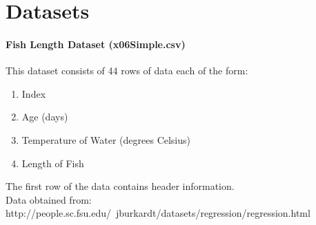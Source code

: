 \documentclass[12pt]{article}
\begin{document}
\newpage
\section*{Datasets}
\paragraph{Fish Length Dataset  (x06Simple.csv)}
This dataset consists of 44 rows of data each of the form:
\begin{enumerate}
\item Index
\item Age (days)
\item Temperature of Water (degrees Celsius)
\item Length of Fish
\end{enumerate}
The first row of the data contains header information.\\

\noindent
Data obtained from:  http://people.sc.fsu.edu/~jburkardt/datasets/regression/regression.html

\newpage
\end{document}
